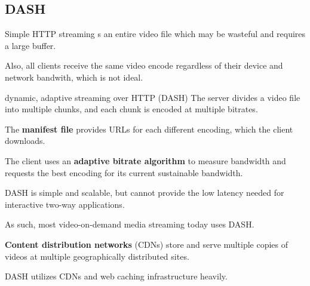 \subsection{DASH}
Simple HTTP streaming s an entire video file which may be wasteful and requires a
large buffer.

Also, all clients receive the same video encode regardless of their device
and network bandwith, which is not ideal.

\begin{defn}{dynamic, adaptive streaming over HTTP (DASH)}
    The server divides a video file into multiple chunks, and each chunk is encoded at multiple bitrates.

    The \textbf{manifest file} provides URLs for each different encoding, which the client downloads.

    The client uses an \textbf{adaptive bitrate algorithm} to measure bandwidth and requests 
    the best encoding for its current sustainable bandwidth.
\end{defn}

DASH is simple and scalable, but cannot provide the low latency needed for interactive two-way applications.

As such, most video-on-demand media streaming today uses DASH.

\textbf{Content distribution networks} (CDNs) store and serve multiple copies of videos at multiple
geographically distributed sites.

DASH utilizes CDNs and web caching infrastructure heavily.